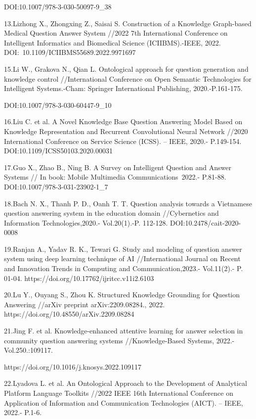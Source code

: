 DOI:10.1007/978-3-030-50097-9\_38

13.Lizhong X., Zhongxing Z., Saisai S. Construction of a Knowledge
Graph-based Medical Question Answer System //2022 7th International
Conference on Intelligent Informatics and Biomedical Science
(ICIIBMS).-IEEE, 2022. DOI:~10.1109/ICIIBMS55689.2022.9971697

15.Li W., Grakova N., Qian L. Ontological approach for question
generation and knowledge control //International Conference on Open
Semantic Technologies for Intelligent Systems.-Cham: Springer
International Publishing, 2020.-P.161-175.

DOI:10.1007/978-3-030-60447-9\_10

16.Liu C. et al. A Novel Knowledge Base Question Answering Model Based
on Knowledge Representation and Recurrent Convolutional Neural Network
//2020 International Conference on Service Science (ICSS). -- IEEE,
2020.- P.149-154. DOI:10.1109/ICSS50103.2020.00031

17.Guo X., Zhao B., Ning B. A Survey on Intelligent Question and Answer
Systems // In book: Mobile Multimedia Communications~2022.- P.81-88.
DOI:10.1007/978-3-031-23902-1\_7

18.Bach N. X., Thanh P. D., Oanh T. T. Question analysis towards a
Vietnamese question answering system in the education domain
//Cybernetics and Information Technologies,2020.- Vol.20(1).-P. 112-128.
DOI:10.2478/cait-2020-0008

19.Ranjan A., Yadav R. K., Tewari G. Study and modeling of question
answer system using deep learning technique of AI //International
Journal on Recent and Innovation Trends in Computing and
Communication,2023.- Vol.11(2).- P. 01-04.
https://doi.org/10.17762/ijritcc.v11i2.6103

20.Lu Y., Ouyang S., Zhou K. Structured Knowledge Grounding for Question
Answering //arXiv preprint arXiv:2209.08284., 2022.
https://doi.org/10.48550/arXiv.2209.08284

21.Jing F. et al. Knowledge-enhanced attentive learning for answer
selection in community question answering systems //Knowledge-Based
Systems, 2022.- Vol.250.:109117.

https://doi.org/10.1016/j.knosys.2022.109117

22.Lyadova L. et al. An Ontological Approach to the Development of
Analytical Platform Language Toolkits //2022 IEEE 16th International
Conference on Application of Information and Communication Technologies
(AICT). -- IEEE, 2022.- P.1-6.

